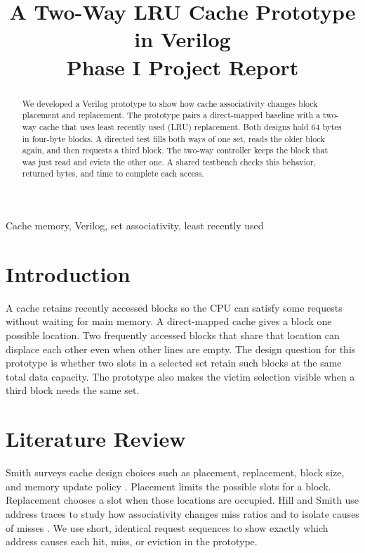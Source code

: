 
\title{A Two-Way LRU Cache Prototype in Verilog\\
\large Phase I Project Report}

\maketitle

\begin{abstract}
We developed a Verilog prototype to show how cache associativity changes
block placement and replacement. The prototype pairs a direct-mapped baseline
with a two-way cache that uses least recently used (LRU) replacement.
Both designs hold 64 bytes in four-byte blocks. A directed test fills both
ways of one set, reads the older block again, and then requests a third
block. The two-way controller keeps the block that was just read and evicts
the other one. A shared testbench checks this behavior, returned bytes,
and time to complete each access.
\end{abstract}

\begin{IEEEkeywords}
Cache memory, Verilog, set associativity, least recently used
\end{IEEEkeywords}

\section{Introduction}
A cache retains recently accessed blocks so the CPU can satisfy some
requests without waiting for main memory. A direct-mapped cache gives a
block one possible location. Two frequently accessed blocks that share
that location can displace each other even when other lines are empty.
The design question for this prototype is whether two slots in a selected
set retain such blocks at the same total data capacity. The prototype also
makes the victim selection visible when a third block needs the same set.

\section{Literature Review}
Smith surveys cache design choices such as placement, replacement, block size,
and memory update policy \cite{smith}. Placement limits the possible slots
for a block. Replacement chooses a slot when those locations are occupied.
Hill and Smith use address traces to study how associativity changes miss
ratios and to isolate causes of misses \cite{hill}. We use short, identical
request sequences to show exactly which address causes each hit, miss,
or eviction in the prototype.

